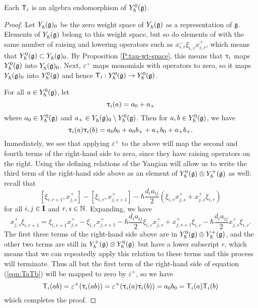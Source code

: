 \begin{lemma}\label{L:mbraid-hom}
    Each $\mbraid_i$ is an algebra endomorphism of $\Yhg[0]$.
\end{lemma}
\begin{proof}
    Let $\Yhg_0$ be the zero weight space of $\Yhg$ as a representation of $\g$.
    Elements of $\Yhg$ belong to this weight space, but so do elements of with the same number of raising and lowering operators such as $x^-_{i,r}\xi_{i,r}x^+_{i,r}$, which means that $\Yhg[0]\subset\Yhg_0$.
    By Proposition \ref{P:tau-wt-space}, this means that $\braid_i$ maps $\Yhg[0]$ into $\Yhg_0$.
    Next, $\varepsilon^+$ maps monomials with operators to zero, so it maps $\Yhg_0$ into $\Yhg[0]$ and hence $\mbraid_i:\Yhg[0]\to\Yhg[0]$.

    For all $a\in\Yhg[0]$, let
    \[\braid_i(a) = a_0+a_+\]
    where $a_0\in\Yhg[0]$ and $a_+\in\Yhg_0\setminus\Yhg[0]$.
    Then for $a,b\in\Yhg[0]$, we have
    \begin{equation}\label{eqn:TaTb}
        \braid_i(a)\braid_i(b) = a_0b_0 + a_0b_+ + a_+b_0 + a_+b_+.
    \end{equation}
    Immediately, we see that applying $\varepsilon^+$ to the above will map the second and fourth terms of the right-hand side to zero, since they have raising operators on the right.
    Using the defining relations of the Yangian will allow us to write the third term of the right-hand side above as an element of $\Yhg[0]\otimes\Yhg[+]$ as well: recall that
    \[[\xi_{i,r+1},x^+_{j,s}]-[\xi_{i,r},x^+_{j,s+1}]-\hbar\frac{d_ia_{ij}}{2}(\xi_{i,r}x^+_{j,s}+x^+_{j,s}\xi_{i,r})\]
    for all $i,j\in\I$ and $r,s\in\N$.
    Expanding, we have
    \[x^+_{j,s}\xi_{i,r+1}=\xi_{i,r+1}x^+_{j,s} -\xi_{i,r}x^+_{j,s+1} -\hbar\frac{d_ia_{ij}}{2}\xi_{i,r}x^+_{j,s} +x^+_{j,s+1}\xi_{i,r} -\hbar\frac{d_ia_{ij}}{2}x^+_{j,s}\xi_{i,r}.\]
    The first three terms of the right-hand side above are in $\Yhg[0]\otimes\Yhg[+]$, and the other two terms are still in $\Yhg[+]\otimes\Yhg[0]$ but have a lower subscript $r$, which means that we can repeatedly apply this relation to these terms and this process will terminate.
    Thus all but the first term of the right-hand side of equation (\ref{eqn:TaTb}) will be mapped to zero by $\varepsilon^+$, so we have
    \[\mbraid_i(ab) = \varepsilon^+(\braid_i(ab)) = \varepsilon^+(\braid_i(a)\braid_i(b)) = a_0b_0 = \mbraid_i(a)\mbraid_i(b)\]
    which completes the proof.
\end{proof}

